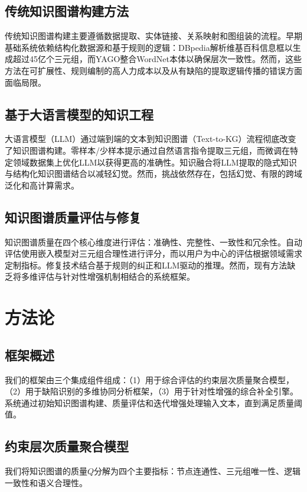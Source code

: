 \documentclass[runningheads]{llncs}
\begin{document}
\subsection{传统知识图谱构建方法}
传统知识图谱构建主要遵循数据提取、实体链接、关系映射和图组装的流程。早期基础系统依赖结构化数据源和基于规则的逻辑：DBpedia解析维基百科信息框以生成超过45亿个三元组，而YAGO整合WordNet本体以确保层次一致性。然而，这些方法在可扩展性、规则编制的高人力成本以及从有缺陷的提取逻辑传播的错误方面面临局限。

\subsection{基于大语言模型的知识工程}
大语言模型（LLM）通过端到端的文本到知识图谱（Text-to-KG）流程彻底改变了知识图谱构建。零样本/少样本提示通过自然语言指令提取三元组，而微调在特定领域数据集上优化LLM以获得更高的准确性。知识融合将LLM提取的隐式知识与结构化知识图谱结合以减轻幻觉。然而，挑战依然存在，包括幻觉、有限的跨域泛化和高计算需求。

\subsection{知识图谱质量评估与修复}
知识图谱质量在四个核心维度进行评估：准确性、完整性、一致性和冗余性。自动评估使用嵌入模型对三元组合理性进行评分，而以用户为中心的评估根据领域需求定制指标。修复技术结合基于规则的纠正和LLM驱动的推理。然而，现有方法缺乏将多维评估与针对性增强机制相结合的系统框架。

\section{方法论}

\subsection{框架概述}
我们的框架由三个集成组件组成：（1）用于综合评估的约束层次质量聚合模型，（2）用于缺陷识别的多维协同分析框架，（3）用于针对性增强的综合补全引擎。系统通过初始知识图谱构建、质量评估和迭代增强处理输入文本，直到满足质量阈值。

\subsection{约束层次质量聚合模型}
\label{subsec:quality_aggregation_model}

我们将知识图谱的质量$Q$分解为四个主要指标：节点连通性、三元组唯一性、逻辑一致性和语义合理性。
\end{document}
